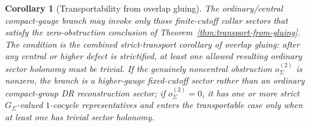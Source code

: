 \documentclass[11pt]{article}
\newtheorem{corollary}[theorem]{Corollary}
\begin{document}
\begin{corollary}[Transportability from overlap gluing]\label{cor:transportability-from-overlap-gluing}
The ordinary/central compact-gauge branch may invoke only those finite-cutoff collar sectors that
satisfy the zero-obstruction conclusion of Theorem~\ref{thm:transport-from-gluing}. The condition
is the combined strict-transport corollary of overlap gluing: after any central or higher defect
is strictified, at least one allowed resulting ordinary sector holonomy must be trivial. If the genuinely
noncentral obstruction \(o^{(2)}_\Sigma\) is nonzero, the branch is a higher-gauge fixed-cutoff sector rather
than an ordinary compact-group DR reconstruction sector; if \(o^{(2)}_\Sigma=0\), it has one or
more strict \(G_\Sigma\)-valued \(1\)-cocycle representatives and enters the transportable case only
when at least one has trivial sector holonomy.
\end{corollary}
\end{document}
